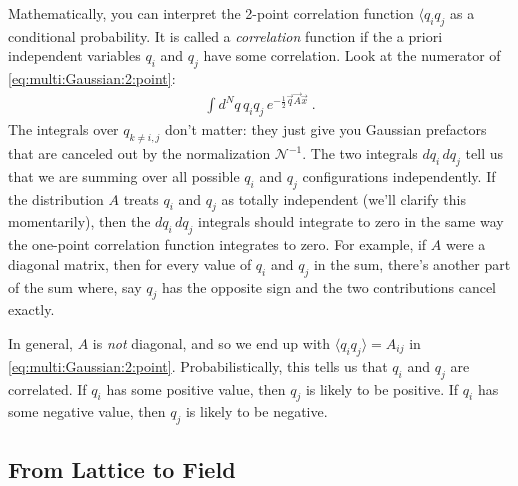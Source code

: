 Mathematically, you can interpret the 2-point correlation function $\langle q_i q_j$ as a conditional probability. It is called a \emph{correlation} function if the a priori independent variables $q_i$ and $q_j$ have some correlation. Look at the numerator of \eqref{eq:multi:Gaussian:2:point}:
\begin{align}
	\int d^Nq\, q_iq_j\, e^{-\frac{1}{2} \vec{q}\vec{A}\vec{x}} \ .
\end{align}
The integrals over $q_{k\neq i, j}$ don't matter: they just give you Gaussian prefactors that are canceled out by the normalization $\mathcal N^{-1}$. The two integrals $dq_i\, dq_j$ tell us that we are summing over all possible $q_i$ and $q_j$ configurations independently. If the distribution $A$ treats $q_i$ and $q_j$ as totally independent (we'll clarify this momentarily), then the $dq_i\, dq_j$ integrals should integrate to zero in the same way the one-point correlation function integrates to zero. For example, if $A$ were a diagonal matrix, then for every value of $q_i$ and $q_j$ in the sum, there's another part of the sum where, say $q_j$ has the opposite sign and the two contributions cancel exactly. 

In general, $A$ is \emph{not} diagonal, and so we end up with $\langle q_i q_j\rangle = A_{ij}$ in \eqref{eq:multi:Gaussian:2:point}. Probabilistically, this tells us that $q_i$ and $q_j$ are correlated. If $q_i$ has some positive value, then $q_j$ is likely to be positive. If $q_i$ has some negative value, then $q_j$ is likely to be negative. 

\subsection{From Lattice to Field} %


